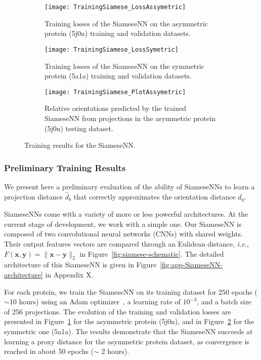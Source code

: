 \begin{figure}
    \centering
    \begin{subfigure}[t]{0.4\textwidth}
        \texttt{[image: TrainingSiamese\_LossAssymetric]}
        \caption{Training losses of the SiameseNN on the asymmetric protein (5j0n) training and validation datasets.}
        \label{fig:losses-siamese-assym}
    \end{subfigure} \quad \quad
    \begin{subfigure}[t]{0.4\textwidth}
        \texttt{[image: TrainingSiamese\_LossSymetric]}
        \caption{Training losses of the SiameseNN on the symmetric protein (5a1a) training and validation datasets.}
        \label{fig:losses-siamese-sym}
    \end{subfigure} \vspace{0.45cm}
    \begin{subfigure}[t]{0.4\textwidth}
        \texttt{[image: TrainingSiamese\_PlotAssymetric]}
        \caption{Relative orientations predicted by the trained SiameseNN from projections in the asymmetric protein (5j0n) testing dataset. }
        \label{fig:learned-distance-siamese}
    \end{subfigure} \vspace{0.35cm}
    \caption{Training results for the SiameseNN.}
    \label{fig:losses-siamese}
\end{figure}

\subsubsection{Preliminary Training Results}

We present here a preliminary evaluation of the ability of SiameseNNs to learn a projection distance $\widehat{d}_b$ that correctly approximates the orientation distance $d_q$.

SiameseNNs come with a variety of more or less powerful architectures. At the current stage of development, we work with a simple one. Our SiameseNN is composed of two convolutional neural networks (CNNs) with shared weights. Their output features vectors are compared through an Eulidean distance, \textit{i.e.}, $F(\mathbf{x},\mathbf{y})=\lVert \mathbf{x}-\mathbf{y}\rVert_2$ in Figure~\ref{fig:siamese-schematic}. The detailed architecture of this SiameseNN is given in Figure~\ref{fig:app-SiameseNN-architecture} in Appendix X.

For each protein, we train the SiameseNN on its training dataset for 250 epochs ($\sim$10 hours) using an Adam optimizer~\cite{kingma2014adam}, a learning rate of $10^{-3}$, and a batch size of 256 projections. The evolution of the training and validation losses are presented in Figure~\ref{fig:losses-siamese-assym} for the asymmetric protein (5j0n), and in Figure~\ref{fig:losses-siamese-sym} for the symmetric one (5a1a). The results demonstrate that the SiameseNN succeeds at learning a proxy distance for the asymmetric protein dataset, as convergence is reached in about 50 epochs ($\sim$ 2 hours).

